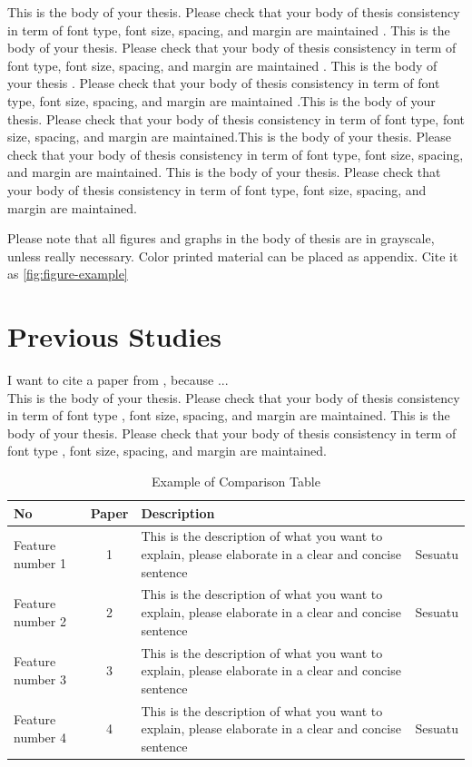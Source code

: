 This is the body of your thesis. Please check that your body of thesis consistency in term of font type, font size, spacing, and margin are maintained \cite{djap_xb_pot}. This is the body of your thesis. Please check that your body of thesis consistency in term of font type, font size, spacing, and margin are maintained \cite{cabral2019review}. This is the body of your thesis \cite{boffa2022towards}. Please check that your body of thesis consistency in term of font type, font size, spacing, and margin are maintained \cite{exabeam}.This is the body of your thesis. Please check that your body of thesis consistency in term of font type, font size, spacing, and margin are maintained.This is the body of your thesis. Please check that your body of thesis consistency in term of font type, font size, spacing, and margin are maintained. This is the body of your thesis. Please check that your body of thesis consistency in term of font type, font size, spacing, and margin are maintained.

Please note that all figures and graphs in the body of thesis are in grayscale, unless really necessary. Color printed material can be placed as appendix. Cite it as  \ref{fig:figure-example}

\section{Previous Studies}
\label{sec:previous-studies}
I want to cite a paper from \cite{shrivastava2019attack}, because ... \\

This is the body of your thesis. Please check that your body of thesis consistency in term of font type \cite{honeypot_spitzner}, font size, spacing, and margin are maintained. This is the body of your thesis. Please check that your body of thesis consistency in term of font type \cite{noor2019machine}, font size, spacing, and margin are maintained.

\begin{table}
	\centering
	\caption{Example of Comparison Table}
	\begin{tabularx}{\linewidth}{X c X X}
			\hline
			\textbf{No} & \textbf{Paper} & \textbf{Description} \\ 
			\hline
			Feature number 1 & 1 & This is the description of what you want to explain, please elaborate in a clear and concise sentence & Sesuatu \\
			Feature number 2 & 2 & This is the description of what you want to explain, please elaborate in a clear and concise sentence & Sesuatu \\
			Feature number 3 & 3 & This is the description of what you want to explain, please elaborate in a clear and concise sentence \\
			Feature number 4 & 4 & This is the description of what you want to explain, please elaborate in a clear and concise sentence & Sesuatu \\
			\hline
	\end{tabularx}
	\label{tab:example-of-comparison-table}
\end{table}

